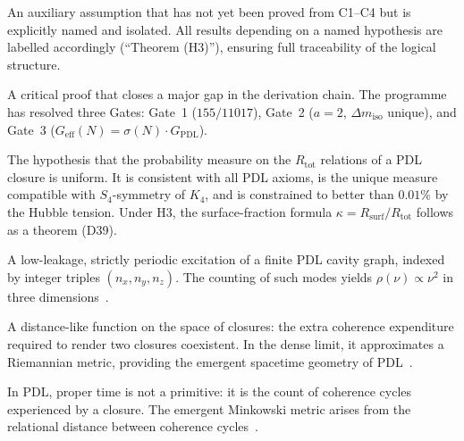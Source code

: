 \documentclass[11pt,a4paper]{article}
\theoremstyle{plain}
\theoremstyle{definition}
\theoremstyle{remark}
\newcommand{\Kfour}{K_4}
\newcommand{\Geff}{G_{\mathrm{eff}}}
\newcommand{\GPDL}{G_{\mathrm{PDL}}}
\newcommand{\Rsurf}{R_{\mathrm{surf}}}
\newcommand{\Rtot}{R_{\mathrm{tot}}}
\newcommand{\sigmaN}{\sigma(N)}
\begin{document}
\begin{description}[style=nextline, leftmargin=2.5cm]
\item[Named hypothesis (H1, H2, H3, \ldots)]
An auxiliary assumption that has not yet been proved from C1--C4 but is explicitly named and isolated.
All results depending on a named hypothesis are labelled accordingly (``Theorem (H3)''), ensuring full traceability of the logical structure.

\item[Gate]
A critical proof that closes a major gap in the derivation chain.
The programme has resolved three Gates: Gate~1 ($155/11017$), Gate~2 ($a=2$, $\Delta m_{\mathrm{iso}}$ unique), and Gate~3 ($\Geff(N)=\sigmaN\cdot\GPDL$).

\item[Indifference Lemma (H3)]
The hypothesis that the probability measure on the $\Rtot$ relations of a PDL closure is uniform.
It is consistent with all PDL axioms, is the unique measure compatible with $S_4$-symmetry of $\Kfour$, and is constrained to better than $0.01\%$ by the Hubble tension.
Under H3, the surface-fraction formula $\kappa = \Rsurf/\Rtot$ follows as a theorem (D39).

\item[Cavity mode]
A low-leakage, strictly periodic excitation of a finite PDL cavity graph, indexed by integer triples $(n_x,n_y,n_z)$.
The counting of such modes yields $\rho(\nu)\propto\nu^2$ in three dimensions~\citep{D18}.

\item[Coherence-cost pseudo-metric]
A distance-like function on the space of closures: the extra coherence expenditure required to render two closures coexistent.
In the dense limit, it approximates a Riemannian metric, providing the emergent spacetime geometry of PDL~\citep{D08}.

\item[Proper time]
In PDL, proper time is not a primitive: it is the count of coherence cycles experienced by a closure.
The emergent Minkowski metric arises from the relational distance between coherence cycles~\citep{D10a}.

\end{description}

\clearpage


\end{document}
